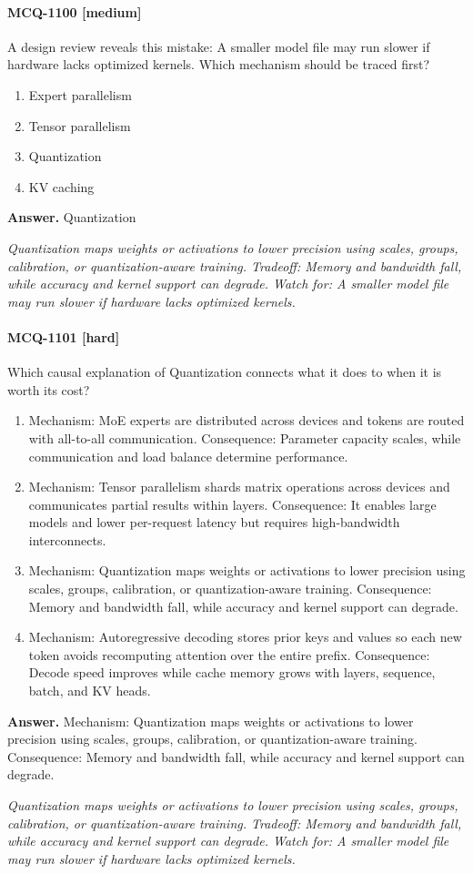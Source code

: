 \paragraph{MCQ-1100 [medium]} A design review reveals this mistake: A smaller model file may run slower if hardware lacks optimized kernels. Which mechanism should be traced first?
\begin{enumerate}[label=\Alph*.]
\item Expert parallelism
\item Tensor parallelism
\item Quantization
\item KV caching
\end{enumerate}
\noindent\textbf{Answer.} Quantization
\par\textit{Quantization maps weights or activations to lower precision using scales, groups, calibration, or quantization-aware training. Tradeoff: Memory and bandwidth fall, while accuracy and kernel support can degrade. Watch for: A smaller model file may run slower if hardware lacks optimized kernels.}
\paragraph{MCQ-1101 [hard]} Which causal explanation of Quantization connects what it does to when it is worth its cost?
\begin{enumerate}[label=\Alph*.]
\item Mechanism: MoE experts are distributed across devices and tokens are routed with all-to-all communication. Consequence: Parameter capacity scales, while communication and load balance determine performance.
\item Mechanism: Tensor parallelism shards matrix operations across devices and communicates partial results within layers. Consequence: It enables large models and lower per-request latency but requires high-bandwidth interconnects.
\item Mechanism: Quantization maps weights or activations to lower precision using scales, groups, calibration, or quantization-aware training. Consequence: Memory and bandwidth fall, while accuracy and kernel support can degrade.
\item Mechanism: Autoregressive decoding stores prior keys and values so each new token avoids recomputing attention over the entire prefix. Consequence: Decode speed improves while cache memory grows with layers, sequence, batch, and KV heads.
\end{enumerate}
\noindent\textbf{Answer.} Mechanism: Quantization maps weights or activations to lower precision using scales, groups, calibration, or quantization-aware training. Consequence: Memory and bandwidth fall, while accuracy and kernel support can degrade.
\par\textit{Quantization maps weights or activations to lower precision using scales, groups, calibration, or quantization-aware training. Tradeoff: Memory and bandwidth fall, while accuracy and kernel support can degrade. Watch for: A smaller model file may run slower if hardware lacks optimized kernels.}
